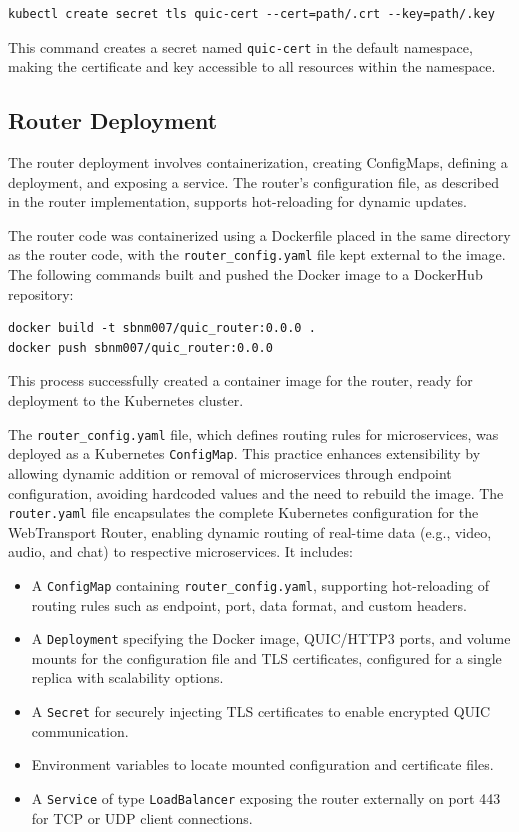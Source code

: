 \begin{lstlisting}
kubectl create secret tls quic-cert --cert=path/.crt --key=path/.key
\end{lstlisting}

This command creates a secret named \texttt{quic-cert} in the default namespace, making the certificate and key accessible to all resources within the namespace.

\subsection{Router Deployment}
The router deployment involves containerization, creating ConfigMaps, defining a deployment, and exposing a service. The router’s configuration file, as described in the router implementation, supports hot-reloading for dynamic updates.

The router code was containerized using a Dockerfile placed in the same directory as the router code, with the \texttt{router\_config.yaml} file kept external to the image. The following commands built and pushed the Docker image to a DockerHub repository:

\begin{lstlisting}
docker build -t sbnm007/quic_router:0.0.0 .
docker push sbnm007/quic_router:0.0.0
\end{lstlisting}

This process successfully created a container image for the router, ready for deployment to the Kubernetes cluster.

The \texttt{router\_config.yaml} file, which defines routing rules for microservices, was deployed as a Kubernetes \texttt{ConfigMap}. This practice enhances extensibility by allowing dynamic addition or removal of microservices through endpoint configuration, avoiding hardcoded values and the need to rebuild the image. The \texttt{router.yaml} file encapsulates the complete Kubernetes configuration for the WebTransport Router, enabling dynamic routing of real-time data (e.g., video, audio, and chat) to respective microservices. It includes:

\begin{itemize}
    \item A \texttt{ConfigMap} containing \texttt{router\_config.yaml}, supporting hot-reloading of routing rules such as endpoint, port, data format, and custom headers.
    \item A \texttt{Deployment} specifying the Docker image, QUIC/HTTP3 ports, and volume mounts for the configuration file and TLS certificates, configured for a single replica with scalability options.
    \item A \texttt{Secret} for securely injecting TLS certificates to enable encrypted QUIC communication.
    \item Environment variables to locate mounted configuration and certificate files.
    \item A \texttt{Service} of type \texttt{LoadBalancer} exposing the router externally on port 443 for TCP or UDP client connections.
\end{itemize}

